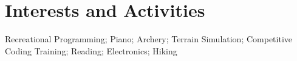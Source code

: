 
\section{Interests and Activities}

Recreational Programming; Piano; Archery; Terrain Simulation; Competitive Coding Training; Reading; Electronics; Hiking

